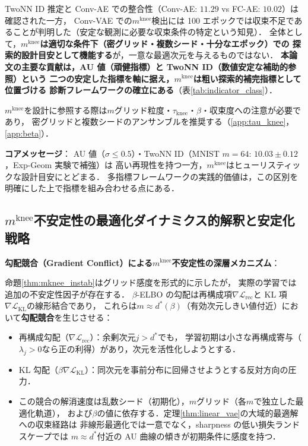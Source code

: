 \documentclass[11pt,a4paper]{jsarticle}
\newcommand{\mknee}{m^{\mathrm{knee}}}
\begin{document}
TwoNN ID 推定と Conv-AE での整合性（Conv-AE: $11.29$ vs FC-AE: $10.02$）は確認された一方，
Conv-VAE での$\mknee$検出には 100 エポックでは収束不足であることが判明した（安定な観測に必要な収束条件の特定という知見）．
全体として，\textbf{$\mknee$は適切な条件下（密グリッド・複数シード・十分なエポック）での
探索的設計目安として機能する}が，一意な最適次元を与えるものではない．
\textbf{本論文の主要な貢献は，AU 値（頑健指標）と TwoNN ID（数値安定な補助的参照）という
二つの安定した指標を軸に据え，$\mknee$は粗い探索的補完指標として位置づける
診断フレームワークの確立にある}（表\ref{tab:indicator_class}）．

$\mknee$を設計に参照する際は$m$グリッド粒度・$\tau_\mathrm{knee}$・$\beta$・収束度への注意が必要であり，
密グリッドと複数シードのアンサンブルを推奨する（\ref{app:tau_knee}，\ref{app:beta}）．

\textbf{コアメッセージ}：
AU 値（$\sigma \leq 0.5$）・TwoNN ID（MNIST $m=64$: $10.03 \pm 0.12$，Exp-Geom 実験で補強）は
高い再現性を持つ一方，$\mknee$はヒューリスティックな設計目安にとどまる．
多指標フレームワークの実践的価値は，この区別を明確にした上で指標を組み合わせる点にある．

\subsection{$\mknee$不安定性の最適化ダイナミクス的解釈と安定化戦略}\label{sec:disc_mknee_improve}

\textbf{勾配競合（Gradient Conflict）による$\mknee$不安定性の深層メカニズム}：

命題\ref{thm:mknee_instab}はグリッド感度を形式的に示したが，
実際の学習では追加の不安定性因子が存在する．
$\beta$-ELBO の勾配は再構成項$\nabla\mathcal{L}_\mathrm{rec}$と
KL 項$\nabla\mathcal{L}_\mathrm{KL}$の線形結合であり，
これらは$m \approx d^*(\beta)$（有効次元しきい値付近）において\textbf{勾配競合}を生じさせる：

\begin{itemize}
  \item 再構成勾配（$\nabla\mathcal{L}_\mathrm{rec}$）：余剰次元$j > d^*$でも，
        学習初期は小さな再構成寄与（$\lambda_j > 0$なら正の利得）があり，次元を活性化しようとする．
  \item KL 勾配（$\beta\nabla\mathcal{L}_\mathrm{KL}$）：同次元を事前分布に回帰させようとする反対方向の圧力．
  \item この競合の解消速度は乱数シード（初期化），$m$グリッド（各$m$で独立した最適化軌道），
        および$\beta$の値に依存する．定理\ref{thm:linear_vae}の大域的最適解への収束経路は
        非線形最適化では一意でなく，sharpness の低い損失ランドスケープでは
        $m \approx d^*$付近の AU 曲線の傾きが初期条件に感度を持つ．
\end{itemize}
\end{document}
